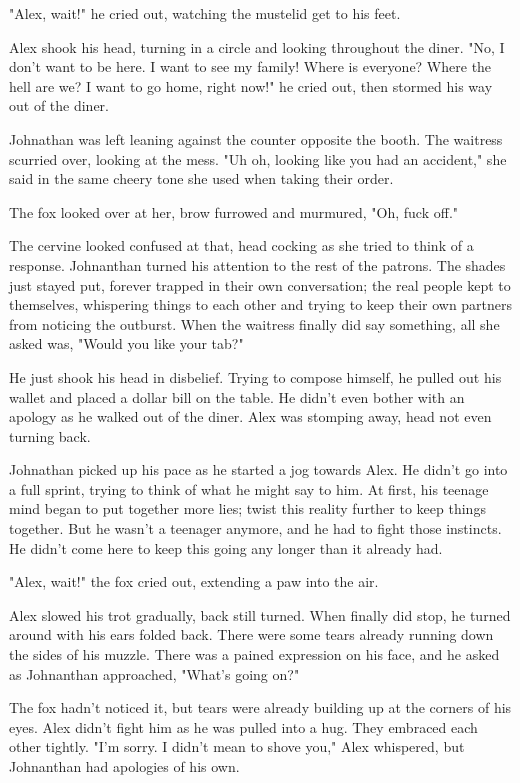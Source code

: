 "Alex, wait!" he cried out, watching the mustelid get to his feet.

Alex shook his head, turning in a circle and looking throughout the diner. "No, I don't want to be here. I want to see my family! Where is everyone? Where the hell are we? I want to go home, right now!" he cried out, then stormed his way out of the diner.

Johnathan was left leaning against the counter opposite the booth. The waitress scurried over, looking at the mess. "Uh oh, looking like you had an accident," she said in the same cheery tone she used when taking their order.

The fox looked over at her, brow furrowed and murmured, "Oh, fuck off."

The cervine looked confused at that, head cocking as she tried to think of a response. Johnanthan turned his attention to the rest of the patrons. The shades just stayed put, forever trapped in their own conversation; the real people kept to themselves, whispering things to each other and trying to keep their own partners from noticing the outburst. When the waitress finally did say something, all she asked was, "Would you like your tab?"

He just shook his head in disbelief. Trying to compose himself, he pulled out his wallet and placed a dollar bill on the table. He didn't even bother with an apology as he walked out of the diner. Alex was stomping away, head not even turning back.

Johnathan picked up his pace as he started a jog towards Alex. He didn't go into a full sprint, trying to think of what he might say to him. At first, his teenage mind began to put together more lies; twist this reality further to keep things together. But he wasn't a teenager anymore, and he had to fight those instincts. He didn't come here to keep this going any longer than it already had.

"Alex, wait!" the fox cried out, extending a paw into the air.

Alex slowed his trot gradually, back still turned. When finally did stop, he turned around with his ears folded back. There were some tears already running down the sides of his muzzle. There was a pained expression on his face, and he asked as Johnanthan approached, "What's going on?"

The fox hadn't noticed it, but tears were already building up at the corners of his eyes. Alex didn't fight him as he was pulled into a hug. They embraced each other tightly. "I'm sorry. I didn't mean to shove you," Alex whispered, but Johnanthan had apologies of his own.

